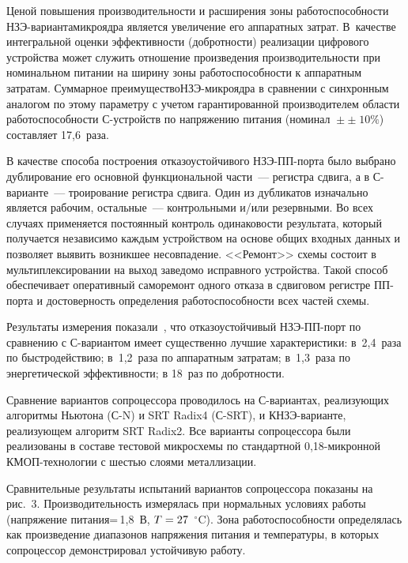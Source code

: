 \begin{multicols}{2}
       Ценой повышения производительности и расширения зоны работоспособности 
       НЗЭ-ва\-ри\-анта\linebreak микроядра является увеличение его аппаратных затрат. 
В~качестве интегральной оценки эффек\-тив\-ности (добротности) реализации цифрового 
устройства может служить отношение произве\-дения производительности при номинальном\linebreak 
питании на ширину зоны работоспособности к аппаратным затратам. Суммарное 
преимущество\linebreak НЗЭ-мик\-ро\-яд\-ра в сравнении с синхронным аналогом по этому параметру 
с учетом гарантированной производителем области ра\-бо\-то\-спо\-соб\-ности С-устройств 
по напряжению питания (номинал ${}\pm$\linebreak $\pm\;10\%$) со\-став\-ля\-ет 17,6~раза.
       
       В качестве способа построения отказоустойчивого НЗЭ-ПП-пор\-та было выбрано 
дублирование его основной функциональной части~--- регистра сдвига, а в 
       С-ва\-ри\-ан\-те~--- троирование регистра сдвига. Один из дубликатов изначально 
является рабочим, остальные~--- контрольными и/или резервными. Во всех случаях 
применяется постоянный контроль одинаковости результата, который получается 
независимо каждым устройством на основе общих входных данных и позволяет выявить 
возникшее несовпадение. <<Ремонт>> схемы состоит в мультиплексировании на выход 
заведомо исправного устройства. Такой способ обеспечивает оперативный саморемонт 
одного отказа в сдвиговом регистре ПП-пор\-та и достоверность определения 
работоспособности всех частей схемы.
       
       Результаты измерения показали~\cite{55-sok}, что отказоустойчивый НЗЭ-ПП-порт 
по сравнению с С-ва\-ри\-ан\-том имеет существенно лучшие характеристики: 
в~2,4~раза по быстродействию; в~1,2~раза по аппаратным затратам; в~1,3~раза по 
энергетической эффективности; в 18~раз по доб\-рот\-ности.
       
       Сравнение вариантов сопроцессора проводилось на С-ва\-ри\-ан\-тах, 
реализующих алгоритмы Ньютона (С-N) и SRT Radix4 (С-SRT), и КНЗЭ-ва\-ри\-ан\-те, 
реализующем алгоритм SRT Radix2. Все варианты сопроцессора были реализованы в составе 
тестовой микросхемы по стандартной 0,18-мик\-рон\-ной КМОП-тех\-но\-ло\-гии с шестью слоями 
металлизации. 
       
       Сравнительные результаты испытаний вариантов сопроцессора показаны на рис.~3. 
Производительность измерялась при нормальных условиях работы (напряжение питания\;=\,1,8~В, 
$T\hm=27$~$^\circ$C). Зона работоспособности определялась как произведение 
диапазонов напряжения питания и температуры, в которых сопроцессор демонстрировал 
устойчивую работу.
       


\end{multicols}
